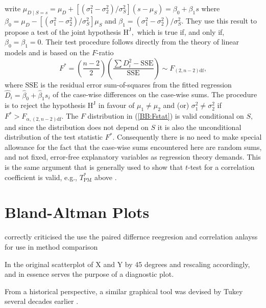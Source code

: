 \documentclass[12pt, a4paper]{report}
\theoremstyle{plain}
\theoremstyle{definition}
\theoremstyle{remark}
\begin{document}
\cite{BB89} write $\mu_{D \mid S=s} = \mu_D + [ ( \sigma^2_1 - \sigma^2_2) / \sigma^2_S ] (s - \mu_S) = \beta_0 + \beta_1 s$ where $\beta_0=\mu_D- [(\sigma^2_1-\sigma^2_2)/ \sigma^2_S] \mu_S$ and $\beta_1 = (\sigma^2_1 - \sigma^2_2 )/ \sigma^2_S.$ They use this result to propose a test of the joint hypothesis $\textrm{H}^\mathrm{J},$ which is true if, and only if, $\beta_0=\beta_1=0.$ Their test procedure follows directly from the theory of linear models \citep[for example]{Hogg} and is based on the $F$-ratio
\begin{equation}\label{BB:Fstat}
F^* = (\frac{n-2}{2}) (\frac{\sum {D_i^2} - \mathrm{SSE}}{\mathrm{SSE}}) \sim F_{(2,n-2)\textrm{df}} ,
\end{equation}
where $\mathrm{SSE}$ is the residual error sum-of-squares from the fitted regression $\hat{D}_i=\hat{\beta}_0 +\hat{\beta}_1 s_i$ of the case-wise differences on the case-wise sums. The procedure is to reject the hypothesis $\textrm{H}^\mathrm{J}$ in favour of $\mu_1\neq\mu_2$ and (or) $\sigma^2_1\neq\sigma^2_2$ if $F^* >  F_{\alpha,(2,n-2)\textrm{df}}.$ The $F$ distribution in (\ref{BB:Fstat}) is valid conditional on $S,$ and since the distribution does not depend on $S$ it is also the unconditional distribution of the test statistic $F^*.$ Consequently there is no need to make special allowance for the fact that the case-wise sums encountered here are random sums, and not fixed, error-free explanatory variables as regression theory demands.   This is the same argument that is generally used to show that $t$-test for a correlation coefficient is valid, e.g., $T^*_\mathrm{PM}$ above \citep[page 499]{Hogg}.




\section*{Bland-Altman Plots}

\citet{BA83} correctly criticised the use the paired differnce reegresion and correlation anlayss for use in method comparison




In the original scatterplot of X and Y by 45 degrees and rescaling accordingly, and in essence serves the purpose of a diagnostic plot.

From a historical perspective, a similar graphical tool was devised by Tukey several decades earlier \citet{wnuk}.
\end{document}
